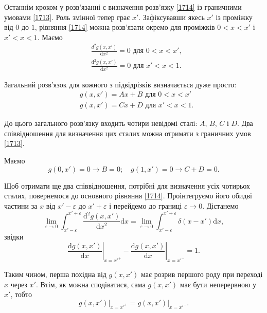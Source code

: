 \documentclass[14pt,twoside]{extreport}
\theoremstyle{mystyle}
\numberwithin{equation}{chapter}
\begin{document}
Останнім кроком у розв'язанні є визначення розв'язку \eqref{1714} із граничними умовами \eqref{1713}. Роль змінної тепер грає $x'$. Зафіксувавши якесь $x'$ із проміжку від $0$ до $1$, рівняння \eqref{1714} можна розв'язати окремо для проміжків $0<x<x'$ і $x'<x<1$. Маємо
\begin{subequations}
	\begin{align}
	&\displaystyle \frac{d^{2}g(x,x')}{\mathrm{d}x^{2}}=0\textrm{ для }0<x<x',\\
	&\displaystyle \frac{\mathrm{d}^{2}g(x,x')}{\mathrm{d}x^{2}}=0\textrm{ для }x'<x<1.
	\end{align}
\end{subequations}

Загальний розв'язок для кожного з підвідрізків визначається дуже просто:
\begin{subequations}\label{1717}
	\begin{align}
	&g(x, x')=Ax+B\textrm{ для }0<x<x'\label{1717a}\\
	&g(x, x')=Cx+D\textrm{ для }x'<x<1.\label{1717b}
	\end{align}
\end{subequations}

До цього загального розв'язку входить чотири невідомі сталі: $A$, $B$, $C$ і $D$. Два співвідношення для визначення цих сталих можна отримати з граничних умов \eqref{1713}.

Маємо
\begin{equation}\label{1718}
g(0, x')=0\to  B=0;\quad g(1, x')=0\to  C+D=0.
\end{equation}

Щоб отримати ще два співвідношення, потрібні для визначення усіх чотирьох сталих, повернемося до основного рівняння \eqref{1714}. Проінтегруємо його обидві частини за $x$ від $x'-\varepsilon$ до $x'+\varepsilon$ і перейдемо до границі $\varepsilon\to  0$. Дістанемо
$$
\lim_{\varepsilon\to 0}\displaystyle\int_{x'-\varepsilon}^{x'+\varepsilon}\frac{\mathrm{d}^{2}g(x,x')}{\mathrm{d}x^{2}}\mathrm{d}x = \lim_{\varepsilon\to 0}\displaystyle\int_{x'-\varepsilon}^{x'+\varepsilon}\delta(x-x') \mathrm{d}x,
$$
звідки
\begin{equation}\label{1719}
\left.\dfrac{\mathrm{d}g(x,x')}{\mathrm{d}x}\right|_{x=x'^{+}}-\left.\dfrac{\mathrm{d}g(x,x')}{\mathrm{d}x}\right|_{x=x'^{-}}=1.
\end{equation}

Таким чином, перша похідна від $g(x, x')$ має розрив першого роду при переході $x$ через $x'$. Втім, як можна сподіватися, сама $g(x, x')$ має бути неперервною у $x'$, тобто
\begin{equation}\label{1720}
\left.g(x, x')\right|_{x=x'^{+}}=\left.g(x, x')\right|_{x=x'^{-}}.
\end{equation}
\end{document}
